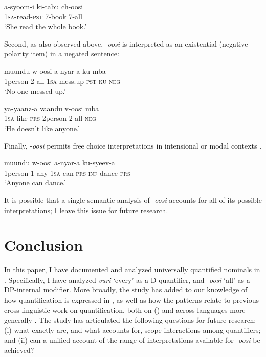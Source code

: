 \documentclass[output=paper]{langsci/langscibook}
\begin{document}
\ea\label{ex:landman:}
\gll a-syoom-i  ki-tabu  ch-oosi\\
     1\textsc{sa}-read-\textsc{pst}    7-book \textsc{7-}all \\
\glt ‘She read the whole book.’
\z

  Second, as also observed above, -\textit{oosi} is interpreted as an existential (negative polarity item) in a negated sentence:  

\ea\label{ex:landman:} 
\gll muundu  w-oosi    a-nyar-a    ku  mba  \\
     1person  2-all    1\textsc{sa}-mess.up-\textsc{pst}  \textsc{ku}  \textsc{neg}\\
\glt ‘No one messed up.’        
\z

\ea\label{ex:landman:}
\gll ya-yaanz-a  vaandu   v-oosi    mba \\
     1\textsc{sa}-like-\textsc{prs}  2person     2-all    \textsc{neg}\\
\glt ‘He doesn't like anyone.’
\z

  Finally, -\textit{oosi} permits free choice interpretations in intensional or modal contexts .

\ea\label{ex:landman:33}
\gll muundu  w-oosi    a-nyar-a  ku-syeev-a\\
     1person  1-any    1\textsc{sa}-can-\textsc{prs}  \textsc{inf-}dance-\textsc{prs} \\
\glt ‘Anyone can dance.’
\z

It is possible that a single semantic analysis of -\textit{oosi} accounts for all of its possible interpretations; I leave this issue for future research. 

\section{Conclusion}\label{sec:landman:5}

In this paper, I have documented and analyzed universally quantified nominals in . Specifically, I have analyzed \textit{vuri} ‘every’ as a D-quantifier, and -\textit{oosi} ‘all’ as a DP-internal modifier. More broadly, the study has added to our knowledge of how quantification is expressed in , as well as how the  patterns relate to previous cross-linguistic work on quantification, both on  (\citealt{ZerbianKrifka2008}) and across languages more generally \citep{Matthewson2013}. The study has articulated the following questions for future research: (i) what exactly are, and what accounts for, scope interactions among  quantifiers; and (ii) can a unified account of the range of interpretations available for -\textit{oosi} be achieved?
\end{document}
